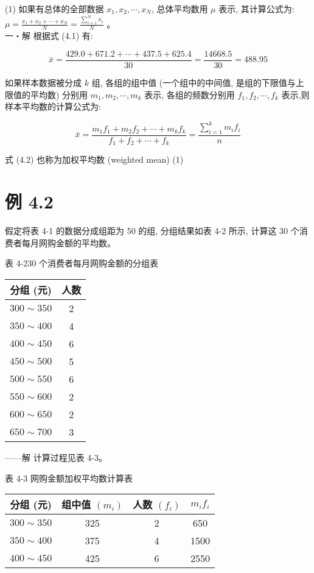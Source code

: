 \documentclass[10pt]{article}
\begin{document}
\begin{CJK*}{UTF8}{bsmi}
(1) 如果有总体的全部数据 $x_{1}, x_{2}, \cdots, x_{N}$, 总体平均数用 $\mu$ 表示, 其计算公式为: $\mu=\frac{x_{1}+x_{2}+\cdots+x_{N}}{N}=\frac{\sum_{i=1}^{N} x_{i}}{N}$ 。\\
一・解 根据式 (4.1) 有:

$$
\bar{x}=\frac{429.0+671.2+\cdots+437.5+625.4}{30}=\frac{14668.5}{30}=488.95
$$

如果样本数据被分成 $k$ 组, 各组的组中值 (一个组中的中间值, 是组的下限值与上限值的平均数) 分别用 $m_{1}, m_{2}, \cdots, m_{k}$ 表示, 各组的频数分别用 $f_{1}, f_{2}, \cdots, f_{k}$ 表示,则样本平均数的计算公式为:


\begin{equation*}
\bar{x}=\frac{m_{1} f_{1}+m_{2} f_{2}+\cdots+m_{k} f_{k}}{f_{1}+f_{2}+\cdots+f_{k}}=\frac{\sum_{i=1}^{k} m_{i} f_{i}}{n} \tag{4.2}
\end{equation*}


式 (4.2) 也称为加权平均数 (weighted mean) (1)

\section*{例 4.2}
假定将表 4-1 的数据分成组距为 50 的组, 分组结果如表 4-2 所示, 计算这 30 个消费者每月网购金额的平均数。

表 4-230 个消费者每月网购金额的分组表

\begin{center}
\begin{tabular}{cc}
\hline
分组 (元) & 人数 \\
\hline
$300 \sim 350$ & 2 \\
$350 \sim 400$ & 4 \\
$400 \sim 450$ & 6 \\
$450 \sim 500$ & 5 \\
$500 \sim 550$ & 6 \\
$550 \sim 600$ & 2 \\
$600 \sim 650$ & 2 \\
$650 \sim 700$ & 3 \\
\hline
\end{tabular}
\end{center}

——解 计算过程见表 4-3。

表 4-3 网购金额加权平均数计算表

\begin{center}
\begin{tabular}{cccc}
\hline
分组 (元) & 组中值 $\left(m_{i}\right)$ & 人数 $\left(f_{i}\right)$ & $m_{i} f_{i}$ \\
\hline
$300 \sim 350$ & 325 & 2 & 650 \\
$350 \sim 400$ & 375 & 4 & 1500 \\
$400 \sim 450$ & 425 & 6 & 2550 \\
\hline
\end{tabular}
\end{center}


\end{CJK*}
\end{document}
